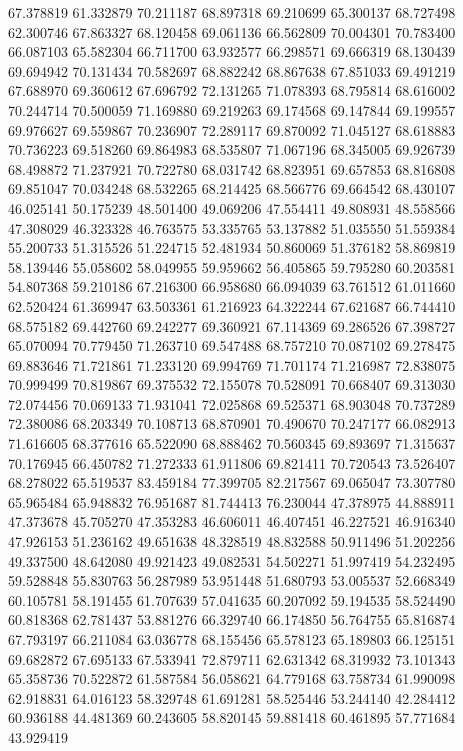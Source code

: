 67.378819
61.332879
70.211187
68.897318
69.210699
65.300137
68.727498
62.300746
67.863327
68.120458
69.061136
66.562809
70.004301
70.783400
66.087103
65.582304
66.711700
63.932577
66.298571
69.666319
68.130439
69.694942
70.131434
70.582697
68.882242
68.867638
67.851033
69.491219
67.688970
69.360612
67.696792
72.131265
71.078393
68.795814
68.616002
70.244714
70.500059
71.169880
69.219263
69.174568
69.147844
69.199557
69.976627
69.559867
70.236907
72.289117
69.870092
71.045127
68.618883
70.736223
69.518260
69.864983
68.535807
71.067196
68.345005
69.926739
68.498872
71.237921
70.722780
68.031742
68.823951
69.657853
68.816808
69.851047
70.034248
68.532265
68.214425
68.566776
69.664542
68.430107
46.025141
50.175239
48.501400
49.069206
47.554411
49.808931
48.558566
47.308029
46.323328
46.763575
53.335765
53.137882
51.035550
51.559384
55.200733
51.315526
51.224715
52.481934
50.860069
51.376182
58.869819
58.139446
55.058602
58.049955
59.959662
56.405865
59.795280
60.203581
54.807368
59.210186
67.216300
66.958680
66.094039
63.761512
61.011660
62.520424
61.369947
63.503361
61.216923
64.322244
67.621687
66.744410
68.575182
69.442760
69.242277
69.360921
67.114369
69.286526
67.398727
65.070094
70.779450
71.263710
69.547488
68.757210
70.087102
69.278475
69.883646
71.721861
71.233120
69.994769
71.701174
71.216987
72.838075
70.999499
70.819867
69.375532
72.155078
70.528091
70.668407
69.313030
72.074456
70.069133
71.931041
72.025868
69.525371
68.903048
70.737289
72.380086
68.203349
70.108713
68.870901
70.490670
70.247177
66.082913
71.616605
68.377616
65.522090
68.888462
70.560345
69.893697
71.315637
70.176945
66.450782
71.272333
61.911806
69.821411
70.720543
73.526407
68.278022
65.519537
83.459184
77.399705
82.217567
69.065047
73.307780
65.965484
65.948832
76.951687
81.744413
76.230044
47.378975
44.888911
47.373678
45.705270
47.353283
46.606011
46.407451
46.227521
46.916340
47.926153
51.236162
49.651638
48.328519
48.832588
50.911496
51.202256
49.337500
48.642080
49.921423
49.082531
54.502271
51.997419
54.232495
59.528848
55.830763
56.287989
53.951448
51.680793
53.005537
52.668349
60.105781
58.191455
61.707639
57.041635
60.207092
59.194535
58.524490
60.818368
62.781437
53.881276
66.329740
66.174850
56.764755
65.816874
67.793197
66.211084
63.036778
68.155456
65.578123
65.189803
66.125151
69.682872
67.695133
67.533941
72.879711
62.631342
68.319932
73.101343
65.358736
70.522872
61.587584
56.058621
64.779168
63.758734
61.990098
62.918831
64.016123
58.329748
61.691281
58.525446
53.244140
42.284412
60.936188
44.481369
60.243605
58.820145
59.881418
60.461895
57.771684
43.929419
